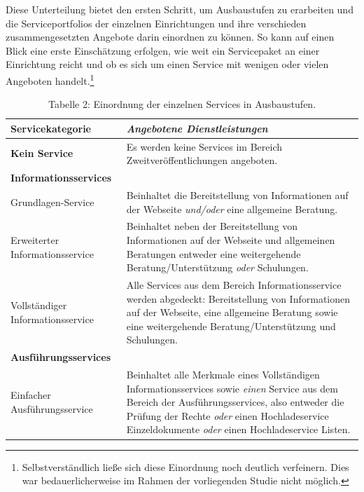 \documentclass[a4paper,
fontsize=11pt,
oneside,
numbers=noperiodatend,
parskip=half-,
bibliography=totoc,
final
]{scrartcl}
\begin{document}
\pagebreak

Diese Unterteilung bietet den ersten Schritt, um Ausbaustufen zu
erarbeiten und die Serviceportfolios der einzelnen Einrichtungen und
ihre verschieden zusammengesetzten Angebote darin einordnen zu können.
So kann auf einen Blick eine erste Einschätzung erfolgen, wie weit ein
Servicepaket an einer Einrichtung reicht und ob es sich um einen Service
mit wenigen oder vielen Angeboten handelt.\footnote{Selbstverständlich
  ließe sich diese Einordnung noch deutlich verfeinern. Dies war
  bedauerlicherweise im Rahmen der vorliegenden Studie nicht möglich.}


\begin{table}[h!]
\caption{Tabelle 2: Einordnung der einzelnen Services in Ausbaustufen.}
    \begin{tabular}{lp{9cm}}
    \toprule
    \textbf{Servicekategorie}                 & \textit{Angebotene Dienstleistungen} \\
    \midrule
    \textbf{Kein Service}                        & Es werden keine Services im Bereich Zweitveröffentlichungen angeboten.  \\ 
    \midrule
    \textbf{Informationsservices}           & ~  \\
    Grundlagen-Service                        & Beinhaltet die Bereitstellung von Informationen auf der Webseite \textit{und/oder} eine allgemeine Beratung.\\
    Erweiterter Informationsservice      & Beinhaltet neben der Bereitstellung von Informationen auf der Webseite und allgemeinen Beratungen entweder eine weitergehende Beratung/Unterstützung \textit{oder} Schulungen.  \\
    Vollständiger Informationsservice   & Alle Services aus dem Bereich Informationsservice werden abgedeckt: Bereitstellung von Informationen auf der Webseite, eine allgemeine Beratung sowie eine weitergehende Beratung/Unterstützung und Schulungen. \\ 
    \midrule
    \textbf{Ausführungsservices}                     & ~    \\
    Einfacher Ausführungsservice      & Beinhaltet alle Merkmale eines Vollständigen Informationsservices sowie \textit{einen} Service aus dem Bereich der Ausführungsservices, also entweder die Prüfung der Rechte \textit{oder} einen Hochladeservice Einzeldokumente \textit{oder} einen Hochladeservice Listen.                                                                                                              \\

\end{tabular}
\end{table}
\end{document}
